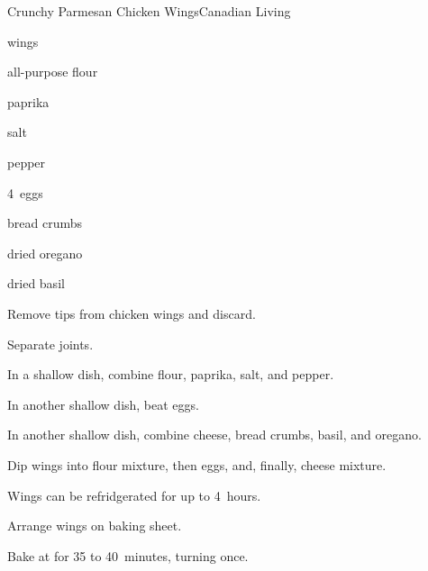 \begin{recipe}{Crunchy Parmesan Chicken Wings}{Canadian Living}{}

\begin{ingredients}
\item {}  wings
\item \C{\half} all-purpose flour
\item \tp{\half} paprika
\item \tp{\quarter} salt
\item \tp{\quarter} pepper
\item 4~eggs
\item {} 
\item \C{\half} bread crumbs
\item {} dried oregano
\item {} dried basil
\end{ingredients}

\begin{directions}
\item Remove tips from chicken wings and discard.
\item Separate joints.
\item In a shallow dish, combine flour, paprika, salt, and pepper.
\item In another shallow dish, beat eggs.
\item In another shallow dish, combine cheese, bread crumbs, basil, and oregano.
\item Dip wings into flour mixture, then eggs, and, finally, cheese mixture.
\item Wings can be refridgerated for up to 4~hours.
\item Arrange wings on baking sheet.
\item Bake at  for 35 to 40~minutes, turning once.
\end{directions}

\end{recipe}
